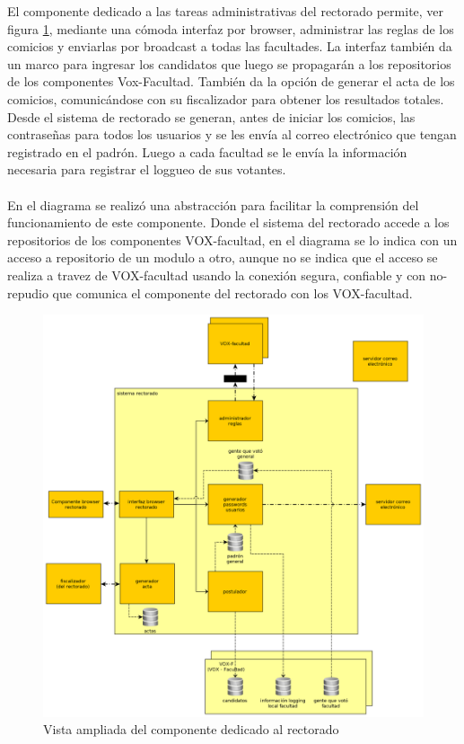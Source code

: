 El componente dedicado a las tareas administrativas del rectorado permite, ver figura \ref{fig:sistemaRectorado}, mediante una cómoda interfaz por browser, administrar las reglas de los comicios y enviarlas por broadcast a todas las facultades. La interfaz también da un marco para ingresar los candidatos que luego se propagarán a los repositorios de los componentes Vox-Facultad. También da la opción de generar el acta de los comicios, comunicándose con su fiscalizador para obtener los resultados totales.
\\
Desde el sistema de rectorado se generan, antes de iniciar los comicios, las contraseñas para todos los usuarios y se les envía al correo electrónico que tengan registrado en el padrón. Luego a cada facultad se le envía la información necesaria para registrar el loggueo de sus votantes.
\\
\\
En el diagrama se realizó una abstracción para facilitar la comprensión del funcionamiento de este componente. Donde el sistema del rectorado accede a los repositorios de los componentes VOX-facultad, en el diagrama se lo indica con un acceso a repositorio de un modulo a otro, aunque no se indica que el acceso se realiza a travez de VOX-facultad usando la conexión segura, confiable y con no-repudio que comunica el componente del rectorado con los VOX-facultad.

\begin{figure}[H]
	\begin{center}
		\includegraphics[scale=0.26]{../diagramas/sistemaRectorado.png}
	\end{center}
	\caption{Vista ampliada del componente dedicado al rectorado}
	\label{fig:sistemaRectorado}
\end{figure} 


